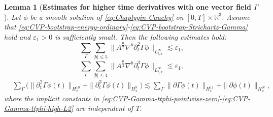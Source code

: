 \documentclass[11pt,twoside]{article}
\def\p{\partial}
\def\ve{\varepsilon}
\def\ls{\lesssim}
\theoremstyle{plain}
\newtheorem{lemma}[theorem]{Lemma}
\theoremstyle{definition}
\theoremstyle{assumption}
\numberwithin{equation}{section}
\begin{document}
		\begin{lemma}[{\bf Estimates for higher time derivatives with one vector field $\Gamma$}]
		\label{lem:CVP-higher-time-derivative-estimates-Gamma}
		Let \(\phi\) be a smooth solution of \eqref{eq:Chaplygin-Cauchy}
		on \([0,T]\times\mathbb R^3\). Assume that
		\eqref{eq:CVP-bootstrap-energy-ordinary}-\eqref{eq:CVP-bootstrap-Strichartz-Gamma} hold and
		\(\ve_1>0\) is sufficiently small. Then the following estimates hold:
		\begin{equation}
			\label{eq:CVP-Gamma-ttphi-pointwise-zero}
			\sum_{\Gamma}
			\sum_{|b|\le 5}
			\big\|
			A^{\frac{\mu}{2}}
			\nabla^b\p_t^2\Gamma\phi
			\big\|_{L^\infty_{t,x}}
			\ls
			\ve_1,
		\end{equation}
		\begin{equation}
			\label{eq:CVP-Gamma-ttphi-low-pointwise}
			\sum_{\Gamma}
			\sum_{|b|\le 4}
			\big\|
			A^{\frac{\mu}{2}}
			\nabla^b\p_t^3\Gamma\phi
			\big\|_{L^\infty_{t,x}}
			\ls
			\ve_1,
		\end{equation}
		\begin{equation}
			\label{eq:CVP-Gamma-ttphi-high-L2}
			\begin{aligned}
				&
				\sum_{\Gamma}
				\big(
				\|\p_t^2\Gamma\phi(t)\|_{H^{10}_x}
				+
				\|\p_t^3\Gamma\phi(t)\|_{H^{9}_x}
				\big)
				\ls
				\sum_{\Gamma}
				\|\p\Gamma\phi(t)\|_{H^{11}_x}
				+
				\|\p\phi(t)\|_{H^N_x},
			\end{aligned}
		\end{equation}
		where the implicit constants in \eqref{eq:CVP-Gamma-ttphi-pointwise-zero}-\eqref{eq:CVP-Gamma-ttphi-high-L2} are independent of \(T\).
	\end{lemma}
\end{document}
